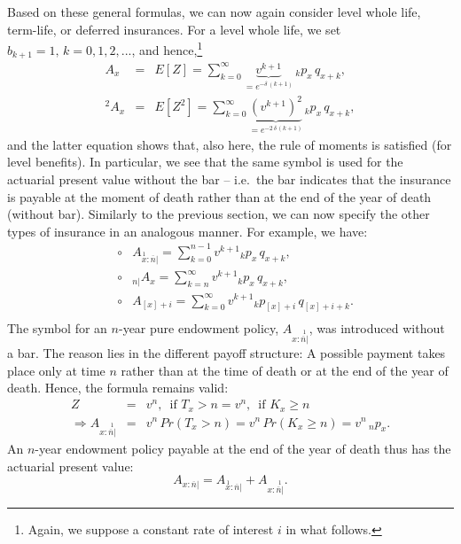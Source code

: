 \documentclass[11pt,fleqn,oneside]{book}
\begin{document}
Based on these general formulas, we can now again consider level whole life, term-life, or deferred insurances. For a level whole life, we set $b_{k+1}=1,\,k=0,1,2,...$, and hence,\footnote{Again, we suppose a constant rate of interest $i$ in what follows.}
\begin{eqnarray*}
{A_x} &=& E[Z] = \sum_{k=0}^{\infty} \underbrace{v^{k+1}}_{= e^{-\delta\,(k+1)}}\,{_kp_x}\,{q_{x+k}},\\
{^2A_x} &=& E[Z^2] = \sum_{k=0}^{\infty} \underbrace{\left(v^{k+1}\right)^2}_{= e^{-2\,\delta\,(k+1)}}\,{_kp_x}\,{q_{x+k}},
\end{eqnarray*}
and the latter equation shows that, also here, the rule of moments is satisfied (for level benefits). In particular, we see that the same symbol is used for the actuarial present value without the bar -- i.e.\ the bar indicates that the insurance is payable at the moment of death rather than at the end of the year of death (without bar). Similarly to the previous section, we can now specify the other types of insurance in an analogous manner. For example, we have:
\begin{eqnarray*}
&\circ& {A_{\stackrel{1}{x}:\overline{n}|}} = \sum_{k=0}^{n-1} v^{k+1} {_kp_x}\,{q_{x+k}},\\
&\circ& {_{n|}A_x} = \sum_{k=n}^{\infty} v^{k+1} {_kp_x}\,{q_{x+k}},\\
&\circ& {A_{[x]+i}} = \sum_{k=0}^{\infty} v^{k+1} {_kp_{[x]+i}}\,{q_{[x]+i+k}}.\\
\end{eqnarray*}
The symbol for an $n$-year pure endowment policy, ${A_{x:\stackrel{1}{\overline{n}|}}}$, was introduced without a bar. The reason lies in the different payoff structure: A possible payment takes place only at time $n$ rather than at the time of death or at the end of the year of death. Hence, the formula remains valid:
\begin{eqnarray*}
Z &=& v^n,\,\text{ if } T_x>n 
= v^n,\,\text{ if } K_x \geq n\\
\Rightarrow {A_{x:\stackrel{1}{\overline{n}|}}} &=& v^n\,Pr\left(T_x>n\right) = v^n\,Pr\left(K_x\geq n\right)
= v^n\,{_np_x}.
\end{eqnarray*}
An $n$-year endowment policy payable at the end of the year of death thus has the actuarial present value:
$$
{A_{x:\overline{n}|}}={A_{\stackrel{1}{x}:\overline{n}|}} + {A_{x:\stackrel{1}{\overline{n}|}}}.
$$
\end{document}
